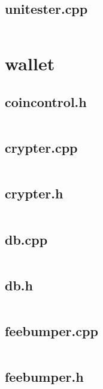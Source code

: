 \documentclass{article}
\begin{document}
\subsection{unitester.cpp}
\inputminted{cpp}{/home/dufferzafar/dev/@clones/bitcoin/src/univalue/test/unitester.cpp}
\newpage

\section{wallet}

\subsection{coincontrol.h}
\inputminted{cpp}{/home/dufferzafar/dev/@clones/bitcoin/src/wallet/coincontrol.h}
\newpage

\subsection{crypter.cpp}
\inputminted{cpp}{/home/dufferzafar/dev/@clones/bitcoin/src/wallet/crypter.cpp}
\newpage

\subsection{crypter.h}
\inputminted{cpp}{/home/dufferzafar/dev/@clones/bitcoin/src/wallet/crypter.h}
\newpage

\subsection{db.cpp}
\inputminted{cpp}{/home/dufferzafar/dev/@clones/bitcoin/src/wallet/db.cpp}
\newpage

\subsection{db.h}
\inputminted{cpp}{/home/dufferzafar/dev/@clones/bitcoin/src/wallet/db.h}
\newpage

\subsection{feebumper.cpp}
\inputminted{cpp}{/home/dufferzafar/dev/@clones/bitcoin/src/wallet/feebumper.cpp}
\newpage

\subsection{feebumper.h}
\inputminted{cpp}{/home/dufferzafar/dev/@clones/bitcoin/src/wallet/feebumper.h}
\newpage
\end{document}
